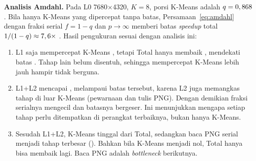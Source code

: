 \textbf{Analisis Amdahl.} Pada L0 7680$\times$4320, $K=8$, porsi K-Means adalah $q=0,868$. Bila hanya K-Means yang dipercepat tanpa batas, Persamaan~\ref{eq:amdahl} dengan fraksi serial $f=1-q$ dan $p\to\infty$ memberi batas \emph{speedup} total $1/(1-q)\approx7,6\times$ \cite{amdahl1967}. Hasil pengukuran sesuai dengan analisis ini:
\begin{enumerate}
    \item L1 saja mempercepat K-Means \LdSKMDelapan, tetapi Total hanya membaik \LdSTotalDelapan, mendekati batas \AmdBatas. Tahap lain belum disentuh, sehingga mempercepat K-Means lebih jauh hampir tidak berguna.
    \item L1+L2 mencapai \LdLdSTotalDelapan, melampaui batas tersebut, karena L2 juga memangkas tahap di luar K-Means (pewarnaan dan tulis PNG). Dengan demikian fraksi serialnya mengecil dan batasnya bergeser. Ini menunjukkan mengapa setiap tahap perlu ditempatkan di perangkat terbaiknya, bukan hanya K-Means.
    \item Sesudah L1+L2, K-Means tinggal \PorsiKMLdLdDelapan{} dari Total, sedangkan baca PNG serial menjadi tahap terbesar (\PorsiBacaLdLdDelapan). Bahkan bila K-Means menjadi nol, Total hanya bisa membaik \AmdBatasLdLd{} lagi. Baca PNG adalah \emph{bottleneck} berikutnya.
\end{enumerate}

